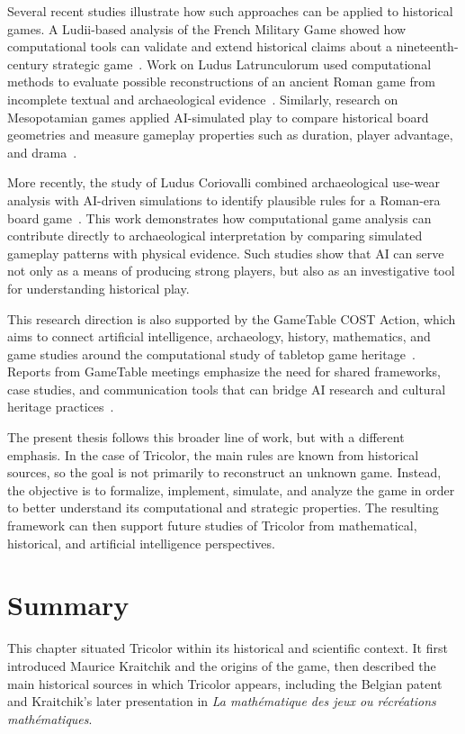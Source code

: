 Several recent studies illustrate how such approaches can be applied to historical games. A Ludii-based analysis of the French Military Game showed how computational tools can validate and extend historical claims about a nineteenth-century strategic game~\cite{piette2021frenchmilitary}. Work on Ludus Latrunculorum used computational methods to evaluate possible reconstructions of an ancient Roman game from incomplete textual and archaeological evidence~\cite{crist2024latrunculorum}. Similarly, research on Mesopotamian games applied AI-simulated play to compare historical board geometries and measure gameplay properties such as duration, player advantage, and drama~\cite{cristpiette2025mesopotamian}.

More recently, the study of Ludus Coriovalli combined archaeological use-wear analysis with AI-driven simulations to identify plausible rules for a Roman-era board game~\cite{crist2026ludus}. This work demonstrates how computational game analysis can contribute directly to archaeological interpretation by comparing simulated gameplay patterns with physical evidence. Such studies show that AI can serve not only as a means of producing strong players, but also as an investigative tool for understanding historical play.

This research direction is also supported by the GameTable COST Action, which aims to connect artificial intelligence, archaeology, history, mathematics, and game studies around the computational study of tabletop game heritage~\cite{moullou2024gametable}. Reports from GameTable meetings emphasize the need for shared frameworks, case studies, and communication tools that can bridge AI research and cultural heritage practices~\cite{soemers2025gametable_london}.

The present thesis follows this broader line of work, but with a different emphasis. In the case of Tricolor, the main rules are known from historical sources, so the goal is not primarily to reconstruct an unknown game. Instead, the objective is to formalize, implement, simulate, and analyze the game in order to better understand its computational and strategic properties. The resulting framework can then support future studies of Tricolor from mathematical, historical, and artificial intelligence perspectives.

\section{Summary}

This chapter situated Tricolor within its historical and scientific context. It first introduced Maurice Kraitchik and the origins of the game, then described the main historical sources in which Tricolor appears, including the Belgian patent and Kraitchik’s later presentation in \textit{La mathématique des jeux ou récréations mathématiques}.


